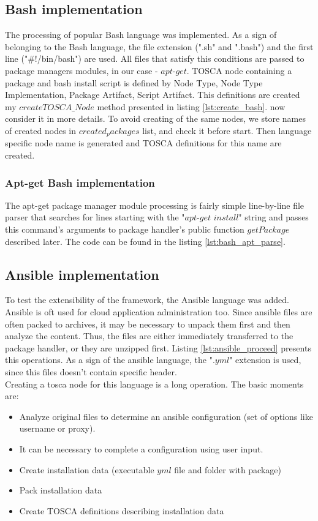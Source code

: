 \subsection*{Bash implementation}
The processing of popular Bash language was implemented.
As a sign of belonging to the Bash language, the file extension (".sh" and ".bash") and the first line ("\#!/bin/bash") are used. 
All files that satisfy this conditions are passed to package managers modules, in our case - $apt$-$get$. 
TOSCA node containing a package and bash install script is defined by Node Type, Node Type Implementation, Package Artifact, Script Artifact.
This definitions are created my $createTOSCA\_Node$ method presented in listing \ref{lst:create_bash}.
now consider it in more details.
To avoid creating of the same nodes, we store names of created nodes in $created_packages$ list, and check it before start.
Then language specific node name is generated and TOSCA definitions for this name are created.

\subsubsection*{Apt-get Bash implementation}
The apt-get package manager module processing is fairly simple line-by-line file parser that searches for lines starting with the "$apt$-$get$ $install$" string and passes this command's arguments to package handler's public function $getPackage$ described later. 
The code can be found in the listing \ref{lst:bash_apt_parse}.
\subsection*{Ansible implementation}
To test the extensibility of the framework, the Ansible language was added.
Ansible is oft used for cloud application administration too.
Since ansible files are often packed to archives, it may be necessary to unpack them first and  then analyze the content.
Thus, the files are either immediately transferred to the package handler, or they are unzipped first.
Listing \ref{lst:ansible_proceed} presents this operations.
As a sign of the ansible language, the ".$yml$" extension is used, since this files doesn't contain specific header.\\
Creating a \gls{tosca} node for this language is a long operation. 
The basic moments are:
\begin{itemize}
	\item Analyze original files to determine an ansible configuration (set of options like username or proxy).
	\item It can be necessary to complete a configuration using user input.
	\item Create installation data (executable $yml$ file and folder with package)
	\item Pack installation data
	\item Create TOSCA definitions describing installation data
\end{itemize} 

